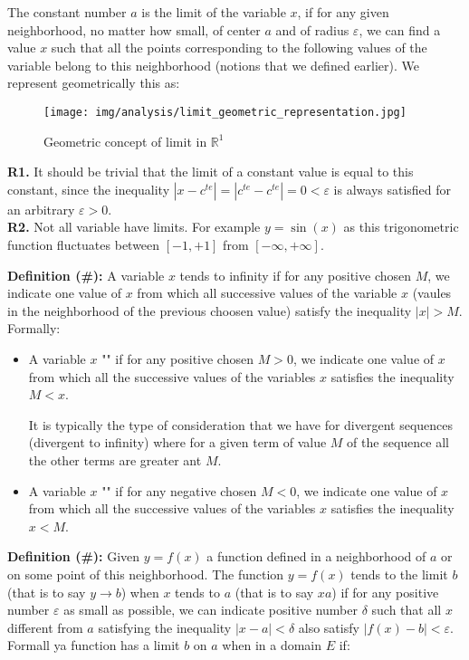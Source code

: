 	The constant number $a$ is the limit of the variable $x$, if for any given neighborhood, no matter how small, of center $a$ and of radius $\varepsilon$, we can find a value $x$ such that all the points corresponding to the following values of the variable belong to this neighborhood (notions that we defined earlier). We represent geometrically this as:
	\begin{figure}[H]
		\centering
		\texttt{[image: img/analysis/limit\_geometric\_representation.jpg]}
		\caption{Geometric concept of limit in $\mathbb{R}^1$}
	\end{figure}
	\begin{tcolorbox}[title=Remark,colframe=black,arc=10pt]
	\textbf{R1.} It should be trivial that the limit of a constant value is equal to this constant, since the inequality $|x-c^{te}|=|c^{te}-c^{te}|=0<\varepsilon $ is always satisfied for an arbitrary $\varepsilon>0$.\\
	
	\textbf{R2.}  Not all variable have limits. For example $y=\sin(x)$ as this trigonometric function fluctuates between $[-1,+1]$ from $[-\infty,+\infty]$.
	\end{tcolorbox}
	
	\textbf{Definition (\#\mydef):} A variable $x$ tends to infinity if for any positive chosen $M$, we indicate one value of $x$ from which all successive values of the variable $x$ (vaules in the neighborhood of the previous choosen value) satisfy the inequality $|x|>M$. Formally:
	
	\begin{itemize}
		\item A variable $x$ "" if for any positive chosen $M>0$, we indicate one value of $x$ from which all the successive values of the variables $x$ satisfies the inequality $M<x$.
	
		It is typically the type of consideration that we have for divergent sequences (divergent to infinity) where for a given term of value $M$ of the sequence all the other terms are greater ant $M$.
		
		
		\item A variable $x$ "" if for any negative chosen $M<0$, we indicate one value of $x$ from which all the successive values of the variables $x$ satisfies the inequality $x<M$.
		
	\end{itemize}
	\textbf{Definition (\#\mydef):} Given $y=f(x)$ a function defined in a neighborhood of $a$ or on some point of this neighborhood. The function $y=f(x)$ tends to the limit $b$ (that is to say $y\rightarrow b$) when $x$ tends to $a$ (that is to say $x a$) if for any positive number $\varepsilon$ as small as possible, we can indicate  positive number $\delta$ such that all $x$ different from $a$ satisfying the inequality $|x-a|<\delta$ also satisfy $|f(x)-b|<\varepsilon$. Formall ya function has a limit $b$ on $a$ when in a domain $E$ if:
	
